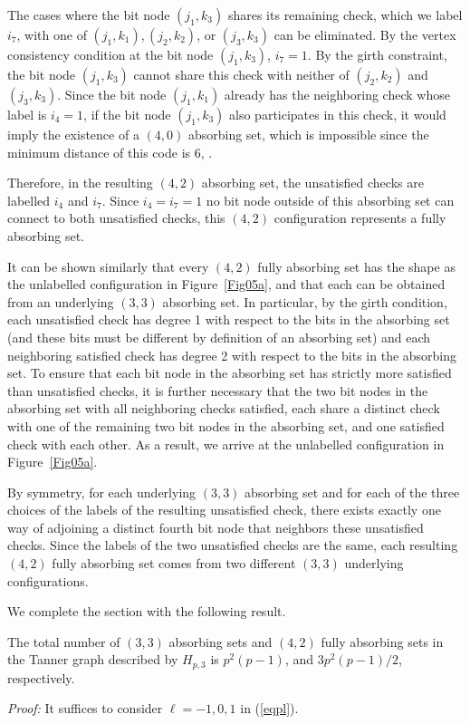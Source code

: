 The cases where the bit node $(j_1,k_3)$ shares its remaining
check, which we label $i_7$, with one of $(j_1,k_1), (j_2,k_2)$,
or $(j_3,k_3)$ can be eliminated. By the vertex consistency
condition at the bit node $(j_1,k_3)$, $i_7=1$. By the girth
constraint, the bit node $(j_1,k_3)$ cannot share this check with
neither of $(j_2,k_2)$ and $(j_3,k_3)$. Since the bit node
$(j_1,k_1)$ already has the neighboring check whose label is
$i_4=1$, if the bit node $(j_1,k_3)$ also participates in this
check, it would imply the existence of a $(4,0)$ absorbing set,
which is impossible since the minimum distance of this code is 6,
\cite{helles}.

Therefore, in the resulting $(4,2)$ absorbing set, the unsatisfied
checks are labelled $i_4$ and $i_7$. Since $i_4=i_7=1$ no bit node
outside of this absorbing set can connect to both unsatisfied
checks, this $(4,2)$ configuration represents a fully absorbing
set.


It can be shown similarly that every $(4,2)$ fully absorbing set
has the shape as the unlabelled configuration in
Figure~\ref{Fig05a}, and that each can be obtained from an
underlying $(3,3)$ absorbing set. In particular, by the girth
condition, each unsatisfied check has degree 1 with respect to the
bits in the absorbing set (and these bits must be different by
definition of an absorbing set) and each neighboring satisfied
check has degree 2 with respect to the bits in the absorbing set.
To ensure that each bit node in the absorbing set has strictly
more satisfied than unsatisfied checks, it is further necessary
that the two bit nodes in the absorbing set with all neighboring
checks satisfied, each share a distinct check with one of the
remaining two bit nodes in the absorbing set, and one satisfied
check with each other. As a result, we arrive at the unlabelled
configuration in Figure~\ref{Fig05a}.


By symmetry, for each underlying $(3,3)$ absorbing set and for
each of the three choices of the labels of the resulting
unsatisfied check, there exists exactly one way of adjoining a
distinct fourth bit node that neighbors these unsatisfied checks.
Since the labels of the two unsatisfied checks are the same, each
resulting $(4,2)$ fully absorbing set comes from two different
$(3,3)$ underlying configurations.

 We complete the section with the following result.
\begin{lemma}\label{le11} The total number of $(3,3)$ absorbing sets and $(4,2)$ fully absorbing sets
in the Tanner graph described by $H_{p,3}$ is $p^2(p-1)$, and
$3p^2(p-1)/2$, respectively.
\end{lemma}
\noindent \textit{Proof:} It suffices to consider $\ell=-1,0,1$ in
(\ref{eqpl}).

